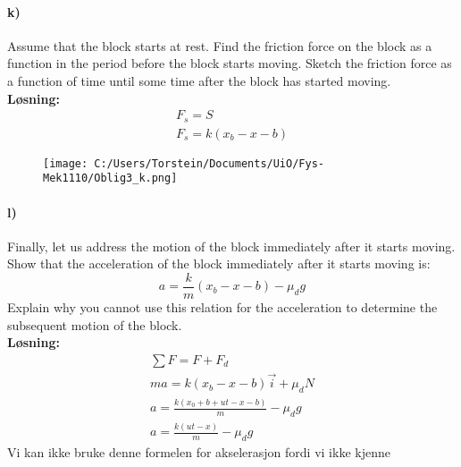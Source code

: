 \documentclass[11pt, A4paper,norsk]{article}
\begin{document}
			\paragraph{k)}
				\begin{flushleft}
Assume that the block starts at rest. Find the friction force on the block as a function in the period before the block starts moving. Sketch the friction force as a function of time until some time after the block has started moving. \\
\vspace{1mm}
\textbf{Løsning:} \\
\vspace{1mm}
					\begin{align}
F_s = S \\
F_s = k(x_b - x - b)
					\end{align}
				\end{flushleft}
				\begin{figure}[H]
\texttt{[image: C:/Users/Torstein/Documents/UiO/Fys-Mek1110/Oblig3\_k.png]}
				\end{figure}









		\paragraph{l)}
			\begin{flushleft}
Finally, let us address the motion of the block immediately after it starts moving. 
Show that the acceleration of the block immediately after it starts moving is: $$a = \frac{k}{m}(x_b - x - b) - \mu_d g$$ 
Explain why you cannot use this relation for the acceleration to determine the subsequent motion of the block. \\
\vspace{1mm}
\textbf{Løsning:} \\
\vspace{1mm}
				\begin{align}
\sum F = F + F_d \\
ma = k(x_b - x - b)\vec{i} + \mu_d N \\
a = \frac{k(x_0 + b + ut - x - b)}{m} - \mu_d g \\
a = \frac{k(ut - x)}{m} - \mu_d g
				\end{align}
Vi kan ikke bruke denne formelen for akselerasjon fordi vi ikke kjenne
			\end{flushleft}
\end{document}
